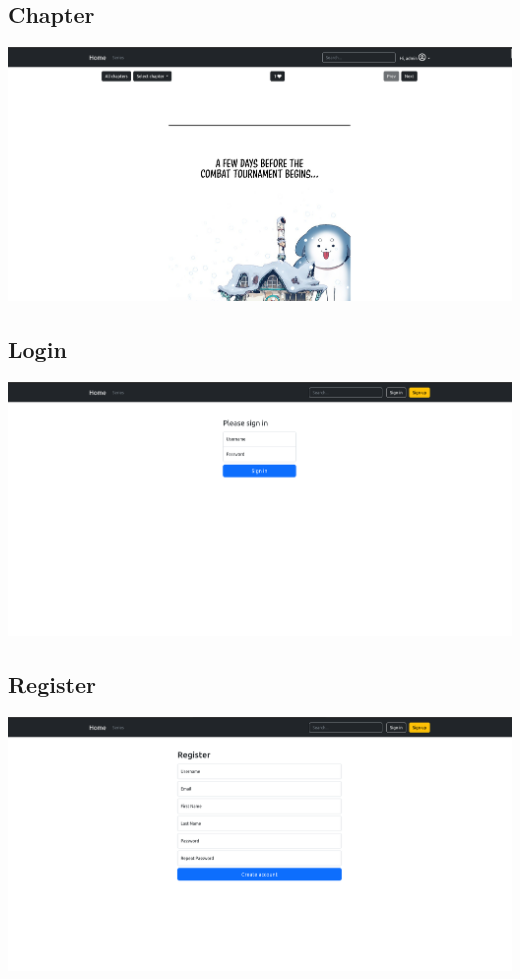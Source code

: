 \subsection{Chapter}
\includegraphics[width=1.0\linewidth]{images/chapter.png}

\subsection{Login}
\includegraphics[width=1.0\linewidth]{images/login.png}

\subsection{Register}
\includegraphics[width=1.0\linewidth]{images/registration.png}

